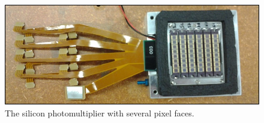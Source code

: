 \begin{figure}
\centering
\includegraphics[width=\linewidth]{Figures/SiPM.jpg}
\caption{The silicon photomultiplier with several pixel faces.}
\label{fig:SiPM}
\end{figure}




